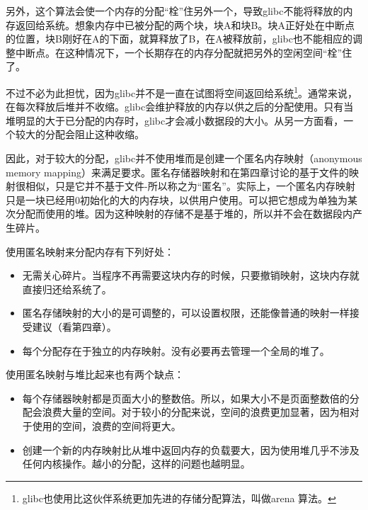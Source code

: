 另外，这个算法会使一个内存的分配“栓”住另外一个，导致glibc不能将释放的内存返回给系统。想象内存中已被分配的两个块，块A和块B。块A正好处在中断点的位置，块B刚好在A的下面，就算释放了B，在A被释放前，glibc也不能相应的调整中断点。在这种情况下，一个长期存在的内存分配就把另外的空闲空间“栓”住了。

不过不必为此担忧，因为glibc并不是一直在试图将空间返回给系统\footnote[1]{glibc也使用比这伙伴系统更加先进的存储分配算法，叫做arena 算法。}。通常来说，在每次释放后堆并不收缩。glibc会维护释放的内存以供之后的分配使用。只有当堆明显的大于已分配的内存时，glibc才会减小数据段的大小。从另一方面看，一个较大的分配会阻止这种收缩。 

因此，对于较大的分配，glibc并不使用堆而是创建一个匿名内存映射（anonymous memory mapping）来满足要求。匿名存储器映射和在第四章讨论的基于文件的映射很相似，只是它并不基于文件-所以称之为“匿名”。实际上，一个匿名内存映射只是一块已经用0初始化的大的内存块，以供用户使用。可以把它想成为单独为某次分配而使用的堆。因为这种映射的存储不是基于堆的，所以并不会在数据段内产生碎片。

使用匿名映射来分配内存有下列好处： 

\begin{itemize}
\item \begin{flushleft}无需关心碎片。当程序不再需要这块内存的时候，只要撤销映射，这块内存就直接归还给系统了。\end{flushleft}
\item \begin{flushleft}匿名存储映射的大小的是可调整的，可以设置权限，还能像普通的映射一样接受建议（看第四章）。\end{flushleft}
\item \begin{flushleft}每个分配存在于独立的内存映射。没有必要再去管理一个全局的堆了。\end{flushleft}
\end{itemize}

使用匿名映射与堆比起来也有两个缺点： 

\begin{itemize}
\item \begin{flushleft}每个存储器映射都是页面大小的整数倍。所以，如果大小不是页面整数倍的分配会浪费大量的空间。对于较小的分配来说，空间的浪费更加显著，因为相对于使用的空间，浪费的空间将更大。\end{flushleft}
\item \begin{flushleft}创建一个新的内存映射比从堆中返回内存的负载要大，因为使用堆几乎不涉及任何内核操作。越小的分配，这样的问题也越明显。\end{flushleft}
\end{itemize}

